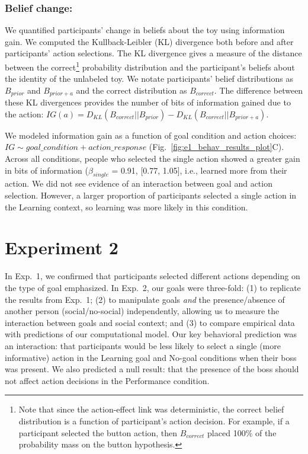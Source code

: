 \documentclass[10pt, letterpaper]{article}
\begin{document}
\subsubsection{Belief change:}\label{belief-change}

We quantified participants' change in beliefs about the toy using
information gain. We computed the Kullback-Leibler (KL) divergence both
before and after participants' action selections. The KL divergence
gives a measure of the distance between the correct\footnote{Note that
  since the action-effect link was deterministic, the correct belief
  distribution is a function of participant's action decision. For
  example, if a participant selected the button action, then
  \(B_{correct}\) placed 100\% of the probability mass on the button
  hypothesis.} probability distribution and the participant's beliefs
about the identity of the unlabeled toy. We notate participants' belief
distributions as \(B_{prior}\) and \(B_{prior+a}\) and the correct
distribution as \(B_{correct}\). The difference between these KL
divergences provides the number of bits of information gained due to the
action:
\(IG(a) = D_{KL} ( B_{correct}|| B_{prior} ) - D_{KL} (B_{correct} || B_{prior+a} )\).

We modeled information gain as a function of goal condition and action
choices: \texttt{$IG \sim goal\_condition + action\_response$}
(Fig.~\ref{fig:e1_behav_results_plot}C). Across all conditions, people
who selected the single action showed a greater gain in bits of
information (\(\beta_{single}\) = 0.91, {[}0.77, 1.05{]}, i.e., learned
more from their action. We did not see evidence of an interaction
between goal and action selection. However, a larger proportion of
participants selected a single action in the Learning context, so
learning was more likely in this condition.

\section{Experiment 2}\label{experiment-2}

In Exp.~1, we confirmed that participants selected different actions
depending on the type of goal emphasized. In Exp.~2, our goals were
three-fold: (1) to replicate the results from Exp.~1; (2) to manipulate
goals \emph{and} the presence/absence of another person
(social/no-social) independently, allowing us to measure the interaction
between goals and social context; and (3) to compare empirical data with
predictions of our computational model. Our key behavioral prediction
was an interaction: that participants would be less likely to select a
single (more informative) action in the Learning goal and No-goal
conditions when their boss was present. We also predicted a null result:
that the presence of the boss should not affect action decisions in the
Performance condition.
\end{document}
